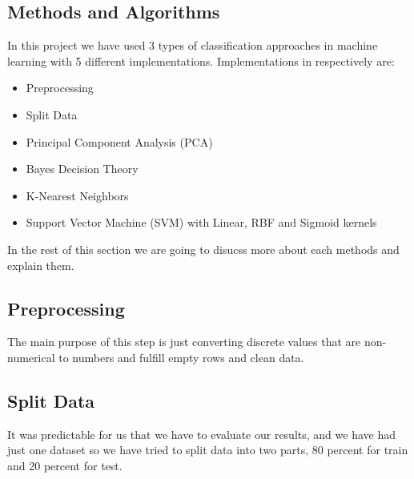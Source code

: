 \documentclass[12pt]{article}
\begin{document}
\subsection{Methods and Algorithms}
In this project we have used 3 types of classification approaches in machine learning with 5 different implementations. Implementations in respectively are:
\begin{itemize}
  \item Preprocessing
  \item Split Data
  \item Principal Component Analysis (PCA)
  \item Bayes Decision Theory
  \item K-Nearest Neighbors 
  \item Support Vector Machine (SVM) with Linear, RBF and Sigmoid kernels
\end{itemize}
In the rest of this section we are going to disucss more about each methods and explain them.

\subsection{Preprocessing}
The main purpose of this step is just converting discrete values that are non-numerical to numbers and fulfill empty rows and clean data.

\subsection{Split Data}
It was predictable for us that we have to evaluate our results, and we have had just one dataset so we have tried to split data into two parts, 80 percent for train and 20 percent for test.
\end{document}
